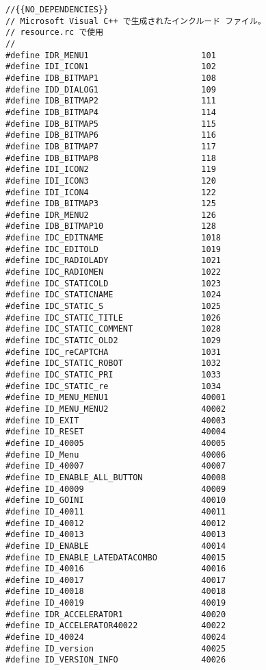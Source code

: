 \begin{lstlisting}[caption=resource.h]
//{{NO_DEPENDENCIES}}
// Microsoft Visual C++ で生成されたインクルード ファイル。
// resource.rc で使用
//
#define IDR_MENU1                       101
#define IDI_ICON1                       102
#define IDB_BITMAP1                     108
#define IDD_DIALOG1                     109
#define IDB_BITMAP2                     111
#define IDB_BITMAP4                     114
#define IDB_BITMAP5                     115
#define IDB_BITMAP6                     116
#define IDB_BITMAP7                     117
#define IDB_BITMAP8                     118
#define IDI_ICON2                       119
#define IDI_ICON3                       120
#define IDI_ICON4                       122
#define IDB_BITMAP3                     125
#define IDR_MENU2                       126
#define IDB_BITMAP10                    128
#define IDC_EDITNAME                    1018
#define IDC_EDITOLD                     1019
#define IDC_RADIOLADY                   1021
#define IDC_RADIOMEN                    1022
#define IDC_STATICOLD                   1023
#define IDC_STATICNAME                  1024
#define IDC_STATIC_S                    1025
#define IDC_STATIC_TITLE                1026
#define IDC_STATIC_COMMENT              1028
#define IDC_STATIC_OLD2                 1029
#define IDC_reCAPTCHA                   1031
#define IDC_STATIC_ROBOT                1032
#define IDC_STATIC_PRI                  1033
#define IDC_STATIC_re                   1034
#define ID_MENU_MENU1                   40001
#define ID_MENU_MENU2                   40002
#define ID_EXIT                         40003
#define ID_RESET                        40004
#define ID_40005                        40005
#define ID_Menu                         40006
#define ID_40007                        40007
#define ID_ENABLE_ALL_BUTTON            40008
#define ID_40009                        40009
#define ID_GOINI                        40010
#define ID_40011                        40011
#define ID_40012                        40012
#define ID_40013                        40013
#define ID_ENABLE                       40014
#define ID_ENABLE_LATEDATACOMBO         40015
#define ID_40016                        40016
#define ID_40017                        40017
#define ID_40018                        40018
#define ID_40019                        40019
#define IDR_ACCELERATOR1                40020
#define ID_ACCELERATOR40022             40022
#define ID_40024                        40024
#define ID_version                      40025
#define ID_VERSION_INFO                 40026

\end{lstlisting}
